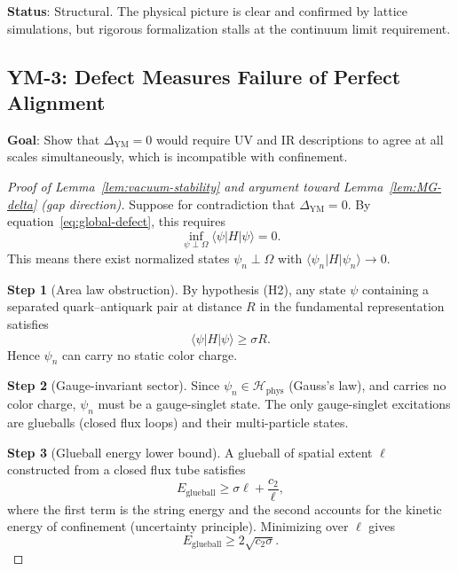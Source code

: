 \documentclass[11pt]{article}
\begin{document}
\textbf{Status}: Structural.  The physical picture is clear and
confirmed by lattice simulations, but rigorous formalization stalls
at the continuum limit requirement.

\subsection{YM-3: Defect Measures Failure of Perfect Alignment}
\label{sec:ym3}

\textbf{Goal}: Show that $\Delta_{\mathrm{YM}} = 0$ would require UV
and IR descriptions to agree at all scales simultaneously, which is
incompatible with confinement.

\begin{proof}[Proof of Lemma~\ref{lem:vacuum-stability}
and argument toward Lemma~\ref{lem:MG-delta} (gap direction)]

Suppose for contradiction that $\Delta_{\mathrm{YM}} = 0$.  By
equation~\eqref{eq:global-defect}, this requires
\begin{equation}\label{eq:gap-zero}
  \inf_{\psi \perp \Omega} \langle\psi|H|\psi\rangle = 0.
\end{equation}
This means there exist normalized states $\psi_n \perp \Omega$ with
$\langle\psi_n|H|\psi_n\rangle \to 0$.

\textbf{Step 1} (Area law obstruction).  By hypothesis (H2), any
state $\psi$ containing a separated quark--antiquark pair at distance
$R$ in the fundamental representation satisfies
\begin{equation}\label{eq:string-energy}
  \langle\psi|H|\psi\rangle \geq \sigma R.
\end{equation}
Hence $\psi_n$ can carry no static color charge.

\textbf{Step 2} (Gauge-invariant sector).  Since $\psi_n \in
\mathcal{H}_{\mathrm{phys}}$ (Gauss's law), and carries no color
charge, $\psi_n$ must be a gauge-singlet state.  The only
gauge-singlet excitations are glueballs (closed flux loops) and their
multi-particle states.

\textbf{Step 3} (Glueball energy lower bound).  A glueball of spatial
extent $\ell$ constructed from a closed flux tube satisfies
\begin{equation}\label{eq:glueball-lower}
  E_{\mathrm{glueball}} \geq \sigma \ell + \frac{c_2}{\ell},
\end{equation}
where the first term is the string energy and the second accounts for
the kinetic energy of confinement (uncertainty principle).  Minimizing
over $\ell$ gives
\begin{equation}\label{eq:glueball-min}
  E_{\mathrm{glueball}} \geq 2\sqrt{c_2 \sigma}.
\end{equation}


\end{proof}
\end{document}
